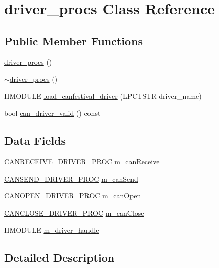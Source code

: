 \hypertarget{classdriver__procs}{
\section{driver\_\-procs Class Reference}
\label{classdriver__procs}
}
\subsection*{Public Member Functions}
\begin{CompactItemize}
\item 
\hyperlink{classdriver__procs_8e3bbe4106667c3c671d24819febd053}{driver\_\-procs} ()
\item 
\hyperlink{classdriver__procs_1abda1ff5fd6c82a3549fad6437ac0f7}{$\sim$driver\_\-procs} ()
\item 
HMODULE \hyperlink{classdriver__procs_719fa10d86bcd9b7a1ab7bea3dec1d03}{load\_\-canfestival\_\-driver} (LPCTSTR driver\_\-name)
\item 
bool \hyperlink{classdriver__procs_a1e608bb39ab9183961b7ded9f27d193}{can\_\-driver\_\-valid} () const
\end{CompactItemize}
\subsection*{Data Fields}
\begin{CompactItemize}
\item 
\hyperlink{drivers__win32_8cpp_f0240c9d4c35205726e5ae81888327dd}{CANRECEIVE\_\-DRIVER\_\-PROC} \hyperlink{classdriver__procs_ccb0ced5c9a7e1d9827639892db97917}{m\_\-can\-Receive}
\item 
\hyperlink{drivers__win32_8cpp_90aa70ea2296b46e3fa52ff5e4bbc399}{CANSEND\_\-DRIVER\_\-PROC} \hyperlink{classdriver__procs_78808f630f632d281a6027f15c3a357f}{m\_\-can\-Send}
\item 
\hyperlink{drivers__win32_8cpp_5db8713e505308b09dbe85ecbe707607}{CANOPEN\_\-DRIVER\_\-PROC} \hyperlink{classdriver__procs_2424edaa753b0dd8406c01e84ef8ddea}{m\_\-can\-Open}
\item 
\hyperlink{drivers__win32_8cpp_5613306de0117eb5242ea9934348eb9f}{CANCLOSE\_\-DRIVER\_\-PROC} \hyperlink{classdriver__procs_d9b6df932422d3d5e20ea185b06e7d44}{m\_\-can\-Close}
\item 
HMODULE \hyperlink{classdriver__procs_34bbbadb3938c98bc54f27c827a96a0a}{m\_\-driver\_\-handle}
\end{CompactItemize}


\subsection{Detailed Description}




